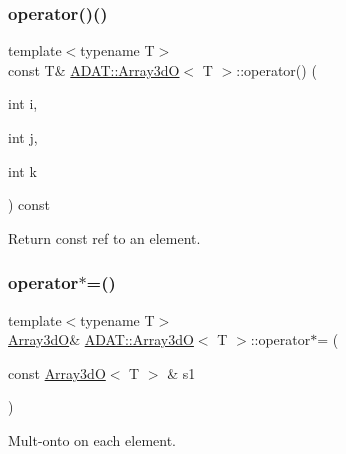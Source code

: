 \subsubsection{\texorpdfstring{operator()()}{operator()()}\hspace{0.1cm}{\footnotesize\ttfamily [6/6]}}
{\footnotesize\ttfamily template$<$typename T$>$ \\
const T\& \mbox{\hyperlink{classADAT_1_1Array3dO}{A\+D\+A\+T\+::\+Array3dO}}$<$ T $>$\+::operator() (\begin{DoxyParamCaption}\item[{int}]{i,  }\item[{int}]{j,  }\item[{int}]{k }\end{DoxyParamCaption}) const\hspace{0.3cm}{\ttfamily [inline]}}



Return const ref to an element. 

\mbox{\label{classADAT_1_1Array3dO_a739c7272b271536ac15a00b5da43b6d6}} 
\subsubsection{\texorpdfstring{operator$\ast$=()}{operator*=()}\hspace{0.1cm}{\footnotesize\ttfamily [1/6]}}
{\footnotesize\ttfamily template$<$typename T$>$ \\
\mbox{\hyperlink{classADAT_1_1Array3dO}{Array3dO}}\& \mbox{\hyperlink{classADAT_1_1Array3dO}{A\+D\+A\+T\+::\+Array3dO}}$<$ T $>$\+::operator$\ast$= (\begin{DoxyParamCaption}\item[{const \mbox{\hyperlink{classADAT_1_1Array3dO}{Array3dO}}$<$ T $>$ \&}]{s1 }\end{DoxyParamCaption})\hspace{0.3cm}{\ttfamily [inline]}}



Mult-\/onto on each element. 

\mbox{\label{classADAT_1_1Array3dO_a739c7272b271536ac15a00b5da43b6d6}} 
